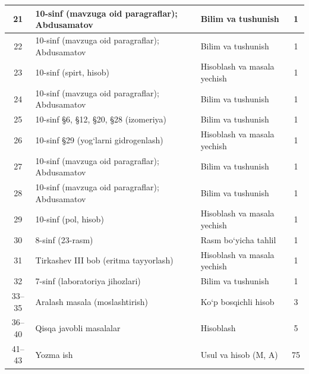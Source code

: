 \documentclass[11pt,a4paper]{article}
\begin{document}
{\begin{longtable}{|c|p{7.2cm}|p{5.4cm}|c|}
21 & 10-sinf (mavzuga oid paragraflar); Abdusamatov & Bilim va tushunish & 1\\\hline
22 & 10-sinf (mavzuga oid paragraflar); Abdusamatov & Bilim va tushunish & 1\\\hline
23 & 10-sinf (spirt, hisob) & Hisoblash va masala yechish & 1\\\hline
24 & 10-sinf (mavzuga oid paragraflar); Abdusamatov & Bilim va tushunish & 1\\\hline
25 & 10-sinf \S{}6, \S{}12, \S{}20, \S{}28 (izomeriya) & Bilim va tushunish & 1\\\hline
26 & 10-sinf \S{}29 (yog`larni gidrogenlash) & Hisoblash va masala yechish & 1\\\hline
27 & 10-sinf (mavzuga oid paragraflar); Abdusamatov & Bilim va tushunish & 1\\\hline
28 & 10-sinf (mavzuga oid paragraflar); Abdusamatov & Bilim va tushunish & 1\\\hline
29 & 10-sinf (pol, hisob) & Hisoblash va masala yechish & 1\\\hline
30 & 8-sinf (23-rasm) & Rasm bo`yicha tahlil & 1\\\hline
31 & Tirkashev III bob (eritma tayyorlash) & Hisoblash va masala yechish & 1\\\hline
32 & 7-sinf (laboratoriya jihozlari) & Bilim va tushunish & 1\\\hline
33--35 & Aralash masala (moslashtirish) & Ko`p bosqichli hisob & 3\\\hline
36--40 & Qisqa javobli masalalar & Hisoblash & 5\\\hline
41--43 & Yozma ish & Usul va hisob (M, A) & 75\\\hline
\end{longtable}}
\end{document}
